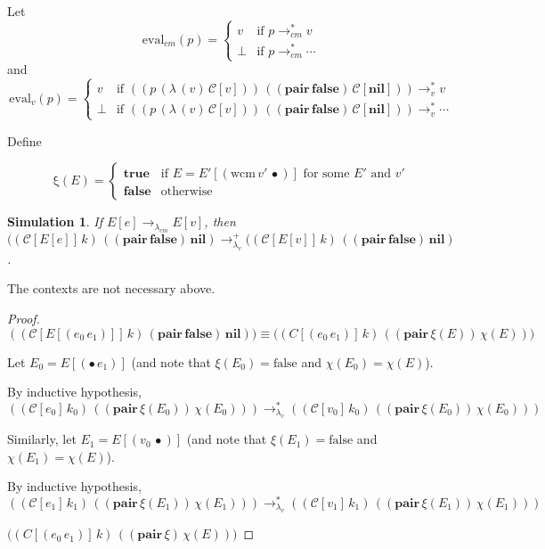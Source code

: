 \documentclass[ms,electronic,twosidetoc,letterpaper,chaptercenter,parttop]{byumsphd}
\begin{document}
Let
\[
\mathrm{eval}_{cm}(p)=\begin{cases}
v     &\text{if $p\rightarrow_{cm}^{*}v$}\\
\perp &\text{if $p\rightarrow_{cm}^{*}\cdots$}
\end{cases}
\]
and
\[
\mathrm{eval}_{v}(p)=\begin{cases}
v     &\text{if $((p\,(\lambda\,(v)\,\mathcal{C}[v]))\,((\mathbf{pair}\,\mathbf{false})\,\mathcal{C}[\mathbf{nil}]))\rightarrow_{v}^{*}v$}\\
\perp &\text{if $((p\,(\lambda\,(v)\,\mathcal{C}[v]))\,((\mathbf{pair}\,\mathbf{false})\,\mathcal{C}[\mathbf{nil}]))\rightarrow_{v}^{*}\cdots$}
\end{cases}
\]

\newtheorem{lemma}{Lemma}
\newtheorem{theorem}{Theorem}
\newtheorem{case}{Case}

Define

\[
\mathrm{\xi}(E)=\begin{cases}
\mathbf{true} &\text{if $E=E'[(\mathrm{wcm}\,v'\,\bullet)]$ for some $E'$ and $v'$}\\
\mathbf{false} &\text{otherwise}
\end{cases}
\]

\newtheorem*{simulation}{Simulation}
\begin{simulation}
If $E[e]\rightarrow_{\lambda_{cm}}E[v]$, then $((\mathcal{C}[E[e]]\,k)\,((\mathbf{pair}\,\mathbf{false})\,\mathbf{nil})\rightarrow_{\lambda_v}^{+}((\mathcal{C}[E[v]]\,k)\,((\mathbf{pair}\,\mathbf{false})\,\mathbf{nil})$.
\end{simulation}
The contexts are not necessary above.

\begin{proof}
$((\mathcal{C}[E[(e_0\,e_1)]]\,k)\,(\mathbf{pair}\,\mathbf{false})\,\mathbf{nil}))\equiv\mathcal(({C}[(e_0\,e_1)]\,k)\,((\mathbf{pair}\,\xi(E))\,\chi(E)))$

Let $E_0=E[(\bullet\,e_1)]$ (and note that $\xi(E_0)=\mathrm{false}$ and $\chi(E_0)=\chi(E)$).

By inductive hypothesis, $((\mathcal{C}[e_0]\,k_0)\,((\mathbf{pair}\,\xi(E_0))\,\chi(E_0)))\rightarrow_{\lambda_v}^{*}((\mathcal{C}[v_0]\,k_0)\,((\mathbf{pair}\,\xi(E_0))\,\chi(E_0)))$

Similarly, let $E_1=E[(v_0\,\bullet)]$ (and note that $\xi(E_1)=\mathrm{false}$ and $\chi(E_1)=\chi(E)$).

By inductive hypothesis, $((\mathcal{C}[e_1]\,k_1)\,((\mathbf{pair}\,\xi(E_1))\,\chi(E_1)))\rightarrow_{\lambda_v}^{*}((\mathcal{C}[v_1]\,k_1)\,((\mathbf{pair}\,\xi(E_1))\,\chi(E_1)))$

$\mathcal(({C}[(e_0\,e_1)]\,k)\,((\mathbf{pair}\,\xi)\,\chi(E)))$
\end{proof}
\end{document}
